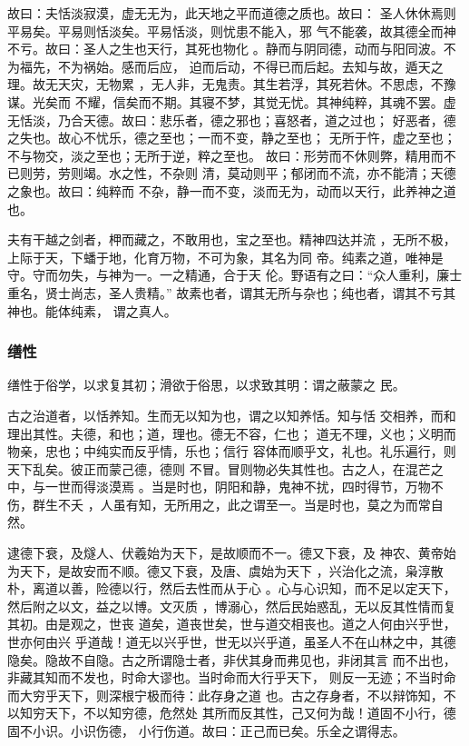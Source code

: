 \documentclass[]{article}
\begin{document}
故曰：夫恬淡寂漠，虚无无为，此天地之平而道德之质也。故曰：
圣人休休焉则平易矣。平易则恬淡矣。平易恬淡，则忧患不能入，邪
气不能袭，故其德全而神不亏。故曰：圣人之生也天行，其死也物化
。静而与阴同德，动而与阳同波。不为福先，不为祸始。感而后应，
迫而后动，不得已而后起。去知与故，遁天之理。故无天灾，无物累
，无人非，无鬼责。其生若浮，其死若休。不思虑，不豫谋。光矣而
不耀，信矣而不期。其寝不梦，其觉无忧。其神纯粹，其魂不罢。虚
无恬淡，乃合天德。故曰：悲乐者，德之邪也；喜怒者，道之过也；
好恶者，德之失也。故心不忧乐，德之至也；一而不变，静之至也；
无所于忤，虚之至也；不与物交，淡之至也；无所于逆，粹之至也。
故曰：形劳而不休则弊，精用而不已则劳，劳则竭。水之性，不杂则
清，莫动则平；郁闭而不流，亦不能清；天德之象也。故曰：纯粹而
不杂，静一而不变，淡而无为，动而以天行，此养神之道也。

夫有干越之剑者，柙而藏之，不敢用也，宝之至也。精神四达并流
，无所不极，上际于天，下蟠于地，化育万物，不可为象，其名为同
帝。纯素之道，唯神是守。守而勿失，与神为一。一之精通，合于天
伦。野语有之曰：``众人重利，廉士重名，贤士尚志，圣人贵精。''
故素也者，谓其无所与杂也；纯也者，谓其不亏其神也。能体纯素， 谓之真人。

\hypertarget{header-n2189}{%
\subsubsection{缮性}\label{header-n2189}}

缮性于俗学，以求复其初；滑欲于俗思，以求致其明：谓之蔽蒙之 民。

古之治道者，以恬养知。生而无以知为也，谓之以知养恬。知与恬
交相养，而和理出其性。夫德，和也；道，理也。德无不容，仁也；
道无不理，义也；义明而物亲，忠也；中纯实而反乎情，乐也；信行
容体而顺乎文，礼也。礼乐遍行，则天下乱矣。彼正而蒙己德，德则
不冒。冒则物必失其性也。古之人，在混芒之中，与一世而得淡漠焉
。当是时也，阴阳和静，鬼神不扰，四时得节，万物不伤，群生不夭
，人虽有知，无所用之，此之谓至一。当是时也，莫之为而常自然。

逮德下衰，及燧人、伏羲始为天下，是故顺而不一。德又下衰，及
神农、黄帝始为天下，是故安而不顺。德又下衰，及唐、虞始为天下
，兴治化之流，枭淳散朴，离道以善，险德以行，然后去性而从于心
。心与心识知，而不足以定天下，然后附之以文，益之以博。文灭质
，博溺心，然后民始惑乱，无以反其性情而复其初。由是观之，世丧
道矣，道丧世矣，世与道交相丧也。道之人何由兴乎世，世亦何由兴
乎道哉！道无以兴乎世，世无以兴乎道，虽圣人不在山林之中，其德
隐矣。隐故不自隐。古之所谓隐士者，非伏其身而弗见也，非闭其言
而不出也，非藏其知而不发也，时命大谬也。当时命而大行乎天下，
则反一无迹；不当时命而大穷乎天下，则深根宁极而待：此存身之道
也。古之存身者，不以辩饰知，不以知穷天下，不以知穷德，危然处
其所而反其性，己又何为哉！道固不小行，德固不小识。小识伤德，
小行伤道。故曰：正己而已矣。乐全之谓得志。
\end{document}
